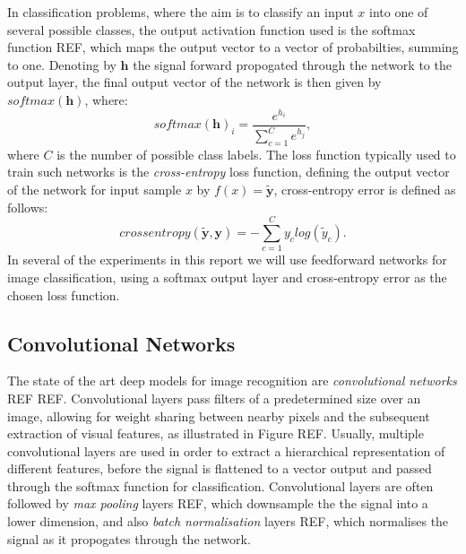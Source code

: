 In classification problems, where the aim is to classify an input $x$ into one of several possible classes, the output activation function used is the softmax function REF, which maps the output vector to a vector of probabilties, summing to one. Denoting by $\mathbf{h}$ the signal forward propogated through the network to the output layer, the final output vector of the network is then given by $softmax(\mathbf{h})$, where:
\begin{equation}
softmax(\mathbf{h})_i = \frac{e^{h_i}}{\sum_{c=1}^Ce^{h_j}},
\end{equation}
where $C$ is the number of possible class labels. The loss function typically used to train such networks is the \textit{cross-entropy} loss function, defining the output vector of the network for input sample $x$ by $f(x) = \tilde{\mathbf{y}}$, cross-entropy error is defined as follows:
\begin{equation}
cross entropy(\tilde{\mathbf{y}},\mathbf{y}) = - \sum_{c=1}^{C} y_{c} log(\tilde{y}_{c}).
\end{equation}
In several of the experiments in this report we will use feedforward networks for image classification, using a softmax output layer and cross-entropy error as the chosen loss function. 

\subsection{Convolutional Networks}
The state of the art deep models for image recognition are \textit{convolutional networks} REF REF. Convolutional layers pass filters of a predetermined size over an image, allowing for weight sharing between nearby pixels and the subsequent extraction of visual features, as illustrated in Figure REF. Usually, multiple convolutional layers are used in order to extract a hierarchical representation of different features, before the signal is flattened to a vector output and passed through the softmax function for classification. Convolutional layers are often followed by \textit{max pooling} layers REF, which downsample the the signal into a lower dimension, and also \textit{batch normalisation} layers REF, which normalises the signal as it propogates through the network. 

